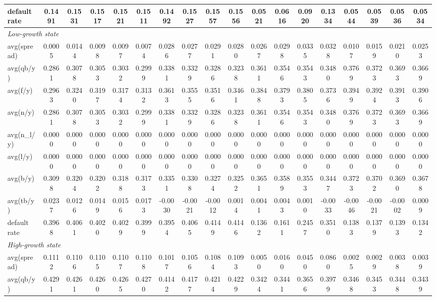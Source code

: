\begin{table}[!htbp]
\begin{tabular}{lccccccccccccccccc}
default rate & 0.1491 & 0.1531 & 0.1517 & 0.1521 & 0.1511 & 0.1492 & 0.1527 & 0.1557 & 0.1556 & 0.0521 & 0.0616 & 0.0920 & 0.1334 & 0.0544 & 0.0539 & 0.0536 & 0.0534 \\
\midrule
\multicolumn{18}{l}{\textit{Low-growth state}} \\
avg(spread) & 0.0005 & 0.0144 & 0.0098 & 0.0097 & 0.0074 & 0.0286 & 0.0277 & 0.0291 & 0.0280 & 0.0267 & 0.0298 & 0.0335 & 0.0328 & 0.0107 & 0.0159 & 0.0210 & 0.0253 \\
avg(qb/y) & 0.2861 & 0.3078 & 0.3053 & 0.3032 & 0.2999 & 0.3381 & 0.3329 & 0.3286 & 0.3238 & 0.3611 & 0.3546 & 0.3543 & 0.3480 & 0.3769 & 0.3723 & 0.3693 & 0.3669 \\
avg(f/y) & 0.2963 & 0.3240 & 0.3197 & 0.3174 & 0.3132 & 0.3613 & 0.3555 & 0.3516 & 0.3461 & 0.3848 & 0.3793 & 0.3805 & 0.3736 & 0.3949 & 0.3924 & 0.3913 & 0.3906 \\
avg(n/y) & 0.2861 & 0.3078 & 0.3053 & 0.3032 & 0.2999 & 0.3381 & 0.3329 & 0.3286 & 0.3238 & 0.3611 & 0.3546 & 0.3543 & 0.3480 & 0.3769 & 0.3723 & 0.3693 & 0.3669 \\
avg(n_l/y) & 0.0000 & 0.0000 & 0.0000 & 0.0000 & 0.0000 & 0.0000 & 0.0000 & 0.0000 & 0.0000 & 0.0000 & 0.0000 & 0.0000 & 0.0000 & 0.0000 & 0.0000 & 0.0000 & 0.0000 \\
avg(l/y) & 0.0000 & 0.0000 & 0.0000 & 0.0000 & 0.0000 & 0.0000 & 0.0000 & 0.0000 & 0.0000 & 0.0000 & 0.0000 & 0.0000 & 0.0000 & 0.0000 & 0.0000 & 0.0000 & 0.0000 \\
avg(b/y) & 0.3098 & 0.3204 & 0.3202 & 0.3188 & 0.3173 & 0.3351 & 0.3308 & 0.3274 & 0.3252 & 0.3651 & 0.3589 & 0.3553 & 0.3447 & 0.3723 & 0.3702 & 0.3690 & 0.3678 \\
avg(tb/y) & 0.0237 & 0.0126 & 0.0149 & 0.0156 & 0.0173 & -0.0030 & -0.0021 & -0.0012 & 0.0014 & 0.0041 & 0.0043 & 0.0010 & -0.0033 & -0.0046 & -0.0021 & -0.0002 & 0.0009 \\
default rate & 0.3968 & 0.4061 & 0.4020 & 0.4029 & 0.3999 & 0.3954 & 0.4065 & 0.4149 & 0.4146 & 0.1362 & 0.1611 & 0.2457 & 0.3510 & 0.1383 & 0.1379 & 0.1393 & 0.1342 \\
\midrule
\multicolumn{18}{l}{\textit{High-growth state}} \\
avg(spread) & 0.1112 & 0.1106 & 0.1105 & 0.1107 & 0.1108 & 0.1017 & 0.1056 & 0.1084 & 0.1093 & 0.0050 & 0.0160 & 0.0450 & 0.0860 & 0.0025 & 0.0029 & 0.0038 & 0.0039 \\
avg(qb/y) & 0.4291 & 0.4261 & 0.4260 & 0.4265 & 0.4270 & 0.4142 & 0.4177 & 0.4214 & 0.4229 & 0.3424 & 0.3441 & 0.3656 & 0.3979 & 0.3468 & 0.3453 & 0.3448 & 0.3439 \\

\end{tabular}
\end{table}
